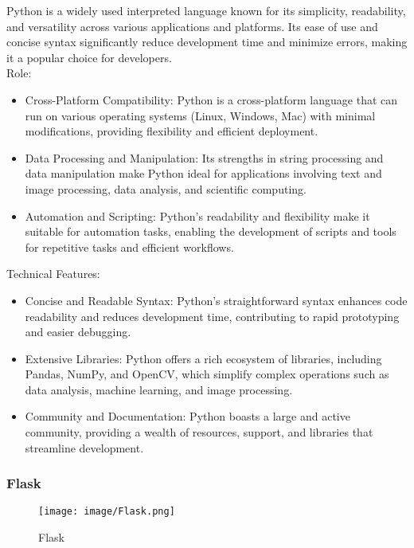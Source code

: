\documentclass[conference]{IEEEtran}
\begin{document}
\noindent Python is a widely used interpreted language known for its simplicity, readability, and versatility across various applications and platforms. Its ease of use and concise syntax significantly reduce development time and minimize errors, making it a popular choice for developers.\\

Role:
\begin{itemize}
    \item Cross-Platform Compatibility: Python is a cross-platform language that can run on various operating systems (Linux, Windows, Mac) with minimal modifications, providing flexibility and efficient deployment.\\
    \item Data Processing and Manipulation: Its strengths in string processing and data manipulation make Python ideal for applications involving text and image processing, data analysis, and scientific computing.\\
    \item Automation and Scripting: Python's readability and flexibility make it suitable for automation tasks, enabling the development of scripts and tools for repetitive tasks and efficient workflows.\\
\end{itemize}

Technical Features:
\begin{itemize}
    \item Concise and Readable Syntax: Python’s straightforward syntax enhances code readability and reduces development time, contributing to rapid prototyping and easier debugging.\\
    \item Extensive Libraries: Python offers a rich ecosystem of libraries, including Pandas, NumPy, and OpenCV, which simplify complex operations such as data analysis, machine learning, and image processing.\\
    \item Community and Documentation: Python boasts a large and active community, providing a wealth of resources, support, and libraries that streamline development.\\
\end{itemize}

\subsubsection{Flask}
\begin{figure}[h!]
    \centering
    \texttt{[image: image/Flask.png]}
    \caption{Flask}
    \label{fig:enter-label}
\end{figure}
\end{document}
